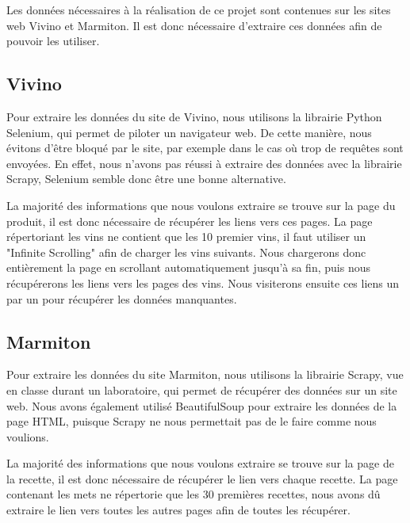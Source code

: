 Les données nécessaires à la réalisation de ce projet sont contenues sur les sites web Vivino et Marmiton. Il est donc nécessaire d'extraire ces données afin de pouvoir les utiliser.

\subsection{Vivino}

Pour extraire les données du site de Vivino, nous utilisons la librairie Python Selenium, qui permet de piloter un navigateur web. De cette manière, nous évitons d'être bloqué par le site, par exemple dans le cas où trop de requêtes sont envoyées. En effet, nous n'avons pas réussi à extraire des données avec la librairie Scrapy, Selenium semble donc être une bonne alternative.

La majorité des informations que nous voulons extraire se trouve sur la page du produit, il est donc nécessaire de récupérer les liens vers ces pages. La page répertoriant les vins ne contient que les 10 premier vins, il faut utiliser un "Infinite Scrolling" afin de charger les vins suivants. Nous chargerons donc entièrement la page en scrollant automatiquement jusqu'à sa fin, puis nous récupérerons les liens vers les pages des vins. Nous visiterons ensuite ces liens un par un pour récupérer les données manquantes.

\subsection{Marmiton}

Pour extraire les données du site Marmiton, nous utilisons la librairie Scrapy, vue en classe durant un laboratoire, qui permet de récupérer des données sur un site web. Nous avons également utilisé BeautifulSoup pour extraire les données de la page HTML, puisque Scrapy ne nous permettait pas de le faire comme nous voulions.

La majorité des informations que nous voulons extraire se trouve sur la page de la recette, il est donc nécessaire de récupérer le lien vers chaque recette. La page contenant les mets ne répertorie que les 30 premières recettes, nous avons dû extraire le lien vers toutes les autres pages afin de toutes les récupérer.
